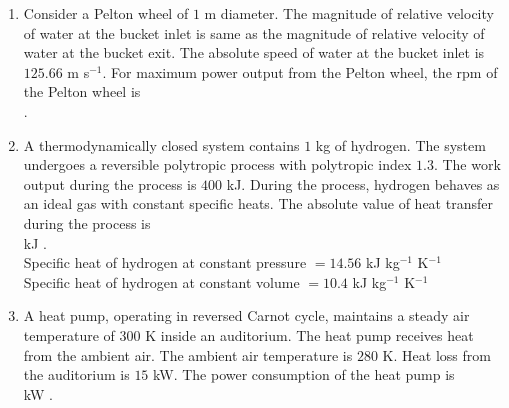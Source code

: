 \documentclass[journal]{IEEEtran}
\begin{document}
\begin{enumerate}[leftmargin=0pt]
\hfill{}

\item
Consider a Pelton wheel of $1$ m diameter. The magnitude of relative velocity of water at the bucket inlet is same as the magnitude of relative velocity of water at the bucket exit. The absolute speed of water at the bucket inlet is $125.66$ m s$^{-1}$. For maximum power output from the Pelton wheel, the rpm of the Pelton wheel is\\
\underline{\hspace{2cm}} .

\hfill{}

\item
A thermodynamically closed system contains $1$ kg of hydrogen. The system undergoes a reversible polytropic process with polytropic index $1.3$. The work output during the process is $400$ kJ. During the process, hydrogen behaves as an ideal gas with constant specific heats. The absolute value of heat transfer during the process is\\
\underline{\hspace{2cm}} kJ .\\
Specific heat of hydrogen at constant pressure $=14.56$ kJ kg$^{-1}$ K$^{-1}$\\
Specific heat of hydrogen at constant volume $=10.4$ kJ kg$^{-1}$ K$^{-1}$

\hfill{}

\item
A heat pump, operating in reversed Carnot cycle, maintains a steady air temperature of $300$ K inside an auditorium. The heat pump receives heat from the ambient air. The ambient air temperature is $280$ K. Heat loss from the auditorium is $15$ kW. The power consumption of the heat pump is\\
\underline{\hspace{2cm}} kW .

\hfill{}


\end{enumerate}
\end{document}
